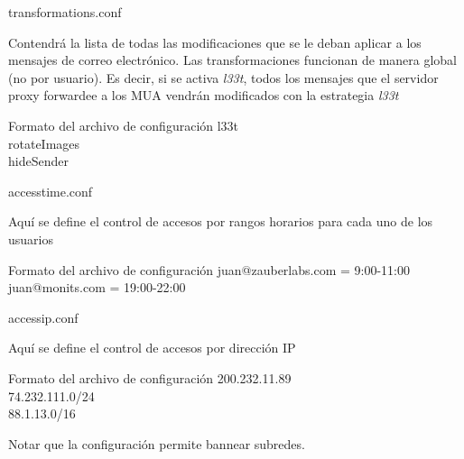 \documentclass{beamer}
\begin{document}
\begin{frame}{transformations.conf}

\par Contendrá la lista de todas las modificaciones que se le deban aplicar a los mensajes de correo electrónico. Las transformaciones funcionan de manera global (no por usuario). Es decir, si se activa \textit{l33t}, todos los mensajes que el servidor proxy forwardee a los MUA vendrán modificados con la estrategia \textit{l33t}\\[0.5cm]

\begin{block}{Formato del archivo de configuración}
l33t\\
rotateImages\\
hideSender\\
\end{block}

\end{frame}

\begin{frame}{access\textunderscore time.conf}

\par Aquí se define el control de accesos por rangos horarios para cada uno de los usuarios\\[0.5cm]

\begin{block}{Formato del archivo de configuración}
juan@zauberlabs.com = 9:00-11:00\\
juan@monits.com = 19:00-22:00\\
\end{block}

\end{frame}

\begin{frame}{access\textunderscore ip.conf}

\par Aquí se define el control de accesos por dirección IP \\[0.5cm]

\begin{block}{Formato del archivo de configuración}
200.232.11.89\\
74.232.111.0/24\\
88.1.13.0/16\\
\end{block}

\par Notar que la configuración permite bannear subredes.

\end{frame}
\end{document}
